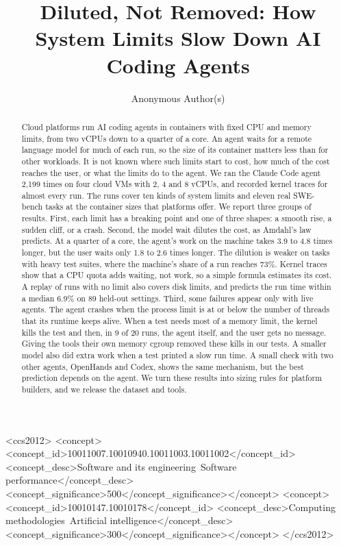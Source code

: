 \documentclass[sigconf,review,anonymous]{acmart}
\begin{document}
\title{Diluted, Not Removed: How System Limits Slow Down AI Coding Agents}

\author{Anonymous Author(s)}

\begin{abstract}
Cloud platforms run AI coding agents in containers with fixed CPU and
memory limits, from two vCPUs down to a quarter of a core. An agent
waits for a remote language model for much of each run, so the size of
its container matters less than for other workloads. It is not known
where such limits start to cost, how much of the cost reaches the user,
or what the limits do to the agent. We ran the Claude Code
agent 2,199 times on four cloud VMs with 2, 4 and 8 vCPUs, and recorded
kernel traces for almost every run. The runs cover ten kinds of system
limits and eleven real SWE-bench tasks at the container sizes that
platforms offer. We report three groups of results. First, each limit
has a breaking point and one of three shapes: a smooth rise, a sudden
cliff, or a crash. Second, the model wait dilutes the cost, as Amdahl's
law predicts. At a quarter of a core, the agent's work on the machine
takes 3.9 to 4.8 times longer, but the user waits only 1.8 to 2.6 times
longer. The dilution is weaker on tasks with heavy test suites, where
the machine's share of a run reaches 73\%. Kernel traces show that a CPU
quota adds waiting, not work, so a simple formula estimates its cost.
A replay of runs with no limit also covers disk limits, and predicts
the run time within a median 6.9\% on 89 held-out settings. Third, some failures appear only with
live agents. The agent crashes when the process limit is at or below the
number of threads that its runtime keeps alive. When a test needs most
of a memory limit, the kernel kills the test and then, in 9 of 20 runs,
the agent itself, and the user gets no message. Giving the tools their
own memory cgroup removed these kills in our tests. A smaller model also
did extra work when a test printed a slow run time. A small check with
two other agents, OpenHands and Codex, shows the same mechanism, but the
best prediction depends on the agent. We turn these results into sizing
rules for platform builders, and we release the dataset and tools.
\end{abstract}

\begin{CCSXML}
<ccs2012>
<concept><concept_id>10011007.10010940.10011003.10011002</concept_id>
<concept_desc>Software and its engineering~Software performance</concept_desc>
<concept_significance>500</concept_significance></concept>
<concept><concept_id>10010147.10010178</concept_id>
<concept_desc>Computing methodologies~Artificial intelligence</concept_desc>
<concept_significance>300</concept_significance></concept>
</ccs2012>
\end{CCSXML}
\end{document}
